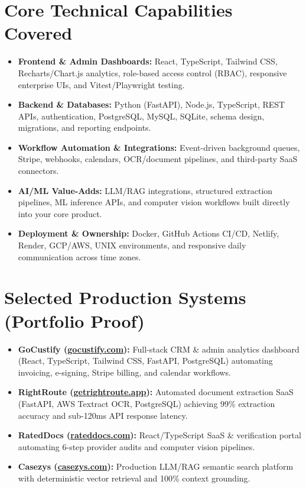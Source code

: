 \documentclass[10.5pt,a4paper]{article}
\begin{document}
\section*{Core Technical Capabilities Covered}
\begin{itemize}[leftmargin=12pt, itemsep=3pt]
    \item \textbf{Frontend \& Admin Dashboards:} React, TypeScript, Tailwind CSS, Recharts/Chart.js analytics, role-based access control (RBAC), responsive enterprise UIs, and Vitest/Playwright testing.
    \item \textbf{Backend \& Databases:} Python (FastAPI), Node.js, TypeScript, REST APIs, authentication, PostgreSQL, MySQL, SQLite, schema design, migrations, and reporting endpoints.
    \item \textbf{Workflow Automation \& Integrations:} Event-driven background queues, Stripe, webhooks, calendars, OCR/document pipelines, and third-party SaaS connectors.
    \item \textbf{AI/ML Value-Adds:} LLM/RAG integrations, structured extraction pipelines, ML inference APIs, and computer vision workflows built directly into your core product.
    \item \textbf{Deployment \& Ownership:} Docker, GitHub Actions CI/CD, Netlify, Render, GCP/AWS, UNIX environments, and responsive daily communication across time zones.
\end{itemize}

\section*{Selected Production Systems (Portfolio Proof)}
\begin{itemize}[leftmargin=12pt, itemsep=3pt]
    \item \textbf{GoCustify (\href{https://gocustify.com}{gocustify.com}):} Full-stack CRM \& admin analytics dashboard (React, TypeScript, Tailwind CSS, FastAPI, PostgreSQL) automating invoicing, e-signing, Stripe billing, and calendar workflows.
    \item \textbf{RightRoute (\href{https://getrightroute.app}{getrightroute.app}):} Automated document extraction SaaS (FastAPI, AWS Textract OCR, PostgreSQL) achieving 99\% extraction accuracy and sub-120ms API response latency.
    \item \textbf{RatedDocs (\href{https://rateddocs.com}{rateddocs.com}):} React/TypeScript SaaS \& verification portal automating 6-step provider audits and computer vision pipelines.
    \item \textbf{Casezys (\href{https://casezys.com}{casezys.com}):} Production LLM/RAG semantic search platform with deterministic vector retrieval and 100\% context grounding.
\end{itemize}
\end{document}
